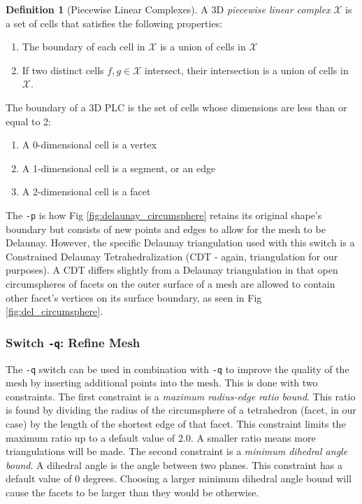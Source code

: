 \documentclass[ma]{uncgdissertationexp}
\theoremstyle{plain}
\theoremstyle{definition}
\newtheorem{definition}[theorem]{Definition}
\theoremstyle{remark}
\begin{document}
\begin{definition}[Piecewise Linear Complexes]
\par A 3D \textit{piecewise linear complex} $\mathcal{X}$ is a set of cells that satisfies the following properties:
\begin{enumerate}
\item The boundary of each cell in $\mathcal{X}$ is a union of cells in $\mathcal{X}$
\item If two distinct cells $f, g \in \mathcal{X}$ intersect, their intersection is a union of cells in $\mathcal{X}$.
\end{enumerate}
\par The boundary of a 3D PLC is the set of cells whose dimensions are less than or equal to 2:
\begin{enumerate}
\item A 0-dimensional cell is a vertex
\item A 1-dimensional cell is a segment, or an edge
\item A 2-dimensional cell is a facet
\end{enumerate}
\end{definition}

The \verb"-p" is how Fig \ref{fig:delaunay_circumsphere} retains its original shape's boundary but consists of new points and edges to allow for the mesh to be Delaunay. However, the specific Delaunay triangulation used with this switch is a Constrained Delaunay Tetrahedralization (CDT - again, triangulation for our purposes). A CDT differs slightly from a Delaunay triangulation in that open circumspheres of facets on the outer surface of a mesh are allowed to contain other facet's vertices on its surface boundary, as seen in Fig \ref{fig:del_circumsphere}.

\cprotect\subsubsection{Switch \verb+-q+: Refine Mesh}
\par The \verb"-q" switch can be used in combination with \verb"-q" to improve the quality of the mesh by inserting additional points into the mesh. This is done with two constraints. The first constraint is a \textit{maximum radius-edge ratio bound}. This ratio is found by dividing the radius of the circumsphere of a tetrahedron (facet, in our case) by the length of the shortest edge of that facet. This constraint limits the maximum ratio up to a default value of 2.0. A smaller ratio means more triangulations will be made. The second constraint is a \textit{minimum dihedral angle bound}. A dihedral angle is the angle between two planes. This constraint has a default value of 0 degrees. Choosing a larger minimum dihedral angle bound will cause the facets to be larger than they would be otherwise.
\end{document}
